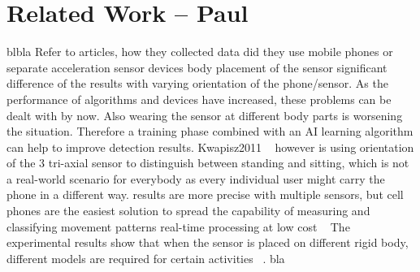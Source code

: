 \documentclass[conference]{IEEEtran}
\begin{document}
\section{Related Work -- Paul}
blbla
Refer to articles, how they collected data
did they use mobile phones or separate acceleration sensor devices
body placement of the sensor
significant difference of the results with varying orientation of the phone/sensor. As the performance of algorithms and devices have increased, these problems can be dealt with by now. Also wearing the sensor at different body parts is worsening the situation. Therefore a training phase combined with an AI learning algorithm can help to improve detection results.
Kwapisz2011 ~\cite{Kwapisz2011} however is using orientation of the 3 tri-axial sensor to distinguish between standing and sitting, which is not a real-world scenario for everybody as every individual user might carry the phone in a different way.
results are more precise with multiple sensors, but cell phones are the easiest solution to spread the capability of measuring and classifying movement patterns
real-time processing at low cost ~\cite{Brezmes2009}
The experimental results show that when the sensor is placed on different rigid body, different models are required for certain activities ~\cite{Henpraserttae2011}.
bla
\\
\\
\\
\\
\\
\\
\\
\\
\\
\\
\\
\\
\\
\\
\\
\\
\\
\\
\\
\\
\\
\\
\\
\\
\\
\\
\\
\\
\\
\\
\\
\\
\\
\\
\\
\\
\\
\\
\\
\end{document}
